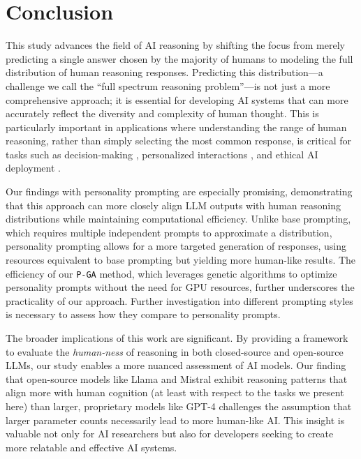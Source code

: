 \section{Conclusion}\label{sec:conclusion}

    This study advances the field of AI reasoning by shifting the focus from merely predicting a single answer chosen by the majority of humans to modeling the full distribution of human reasoning responses. Predicting this distribution---a challenge we call the ``full spectrum reasoning problem''---is not just a more comprehensive approach; it is essential for developing AI systems that can more accurately reflect the diversity and complexity of human thought. This is particularly important in applications where understanding the range of human reasoning, rather than simply selecting the most common response, is critical for tasks such as decision-making \citep{stone_artificial_2020, lai_towards_2023}, personalized interactions \citep{fitzpatrick_delivering_2017, araujo_speaking_2024}, and ethical AI deployment \citep{mittelstadt_principles_2019}.

    Our findings with personality prompting are especially promising, demonstrating that this approach can more closely align LLM outputs with human reasoning distributions while maintaining computational efficiency. Unlike base prompting, which requires multiple independent prompts to approximate a distribution, personality prompting allows for a more targeted generation of responses, using resources equivalent to base prompting but yielding more human-like results. The efficiency of our \texttt{P-GA} method, which leverages genetic algorithms to optimize personality prompts without the need for GPU resources, further underscores the practicality of our approach. Further investigation into different prompting styles \citep{liu_pre-train_2023, sahoo_systematic_2024} is necessary to assess how they compare to personality prompts.

    The broader implications of this work are significant. By providing a framework to evaluate the \textit{human-ness} of reasoning in both closed-source \citep{lieber_jamba_2024, templeton2024scaling} and open-source \citep{falcon40b, vicuna2023, workshop_bloom_2023} LLMs, our study enables a more nuanced assessment of AI models. Our finding that open-source models like Llama and Mistral exhibit reasoning patterns that align more with human cognition (at least with respect to the tasks we present here) than larger, proprietary models like GPT-4 challenges the assumption that larger parameter counts necessarily lead to more human-like AI. This insight is valuable not only for AI researchers but also for developers seeking to create more relatable and effective AI systems.

